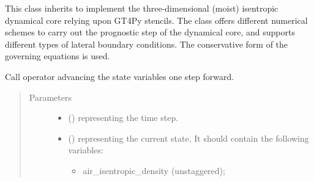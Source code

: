 \documentclass[letterpaper,10pt,english]{sphinxmanual}
\begin{document}
\begin{fulllineitems}
\label{\detokenize{api:tasmania.dycore.dycore_isentropic.DynamicalCoreIsentropic}}
This class inherits {\hyperref[\detokenize{api:tasmania.dycore.dycore.DynamicalCore}]{}} to implement the three-dimensional
(moist) isentropic dynamical core relying upon GT4Py stencils. The class offers different numerical
schemes to carry out the prognostic step of the dynamical core, and supports different types of
lateral boundary conditions. The conservative form of the governing equations is used.

\begin{fulllineitems}
\label{\detokenize{api:tasmania.dycore.dycore_isentropic.DynamicalCoreIsentropic.__call__}}
Call operator advancing the state variables one step forward.
\begin{quote}\begin{description}
\item[{Parameters}] \leavevmode\begin{itemize}
\item {} 
 () \textendash{}  representing the time step.

\item {} 
 () \textendash{} 
{\hyperref[\detokenize{api:tasmania.storages.state_isentropic.StateIsentropic}]{}} representing the current state.
It should contain the following variables:
\begin{itemize}
\item {} 
air\_isentropic\_density (unstaggered);


\end{itemize}
\end{itemize}
\end{description}
\end{quote}
\end{fulllineitems}
\end{fulllineitems}
\end{document}

